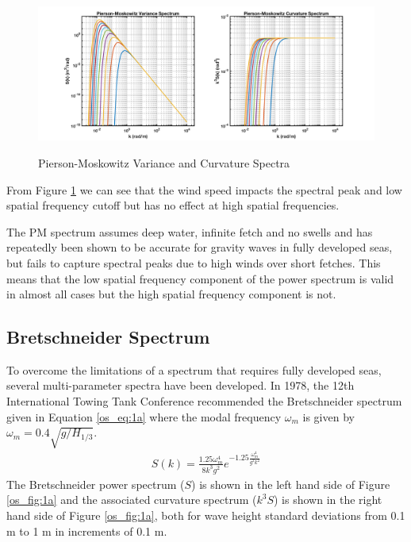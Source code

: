  \begin{figure}[H]
  \begin{center}
\includegraphics[width=6in]{../media/Ocean_Surface/PM_variance_curvature_spectrum.png}
  \end{center}
  \renewcommand{\baselinestretch}{1} \small\normalsize
  \begin{quote}
    \caption[Pierson-Moskowitz Variance and Curvature Spectra]{Pierson-Moskowitz Variance and Curvature Spectra\label{os_fig:1}}
  \end{quote}
\end{figure}
 \renewcommand{\baselinestretch}{2} \small\normalsize
 
 From Figure \ref{os_fig:1} we can see that the wind speed impacts the spectral peak and low spatial frequency cutoff but has no effect at high spatial frequencies.
 
The PM spectrum assumes deep water, infinite fetch and no swells and has repeatedly been shown to be accurate for gravity waves in fully developed seas, but fails to capture spectral peaks due to high winds over short fetches. This means that the low spatial frequency component of the power spectrum is valid in almost all cases but the high spatial frequency component is not.

\subsection{Bretschneider Spectrum}
To overcome the limitations of a spectrum that requires fully developed seas, several multi-parameter spectra have been developed. In 1978, the 12th International Towing Tank Conference recommended the Bretschneider spectrum \cite{michel_sea_spectra} given in Equation \ref{os_eq:1a} where the modal frequency $\omega_m$ is given by $\omega_m = 0.4\sqrt{g/H_{1/3}}$.
\begin{equation}
  \begin{gathered}
  \label{os_eq:1a}
  S(k) = \frac{1.25 \omega_m^4}{8k^3g^2}e^{-1.25\frac{\omega_m^4}{g^2k^2}} 
  \end{gathered}
\end{equation}
\renewcommand{\baselinestretch}{2} \small\normalsize
The Bretschneider power spectrum ($S$) is shown in the left hand side of Figure \ref{os_fig:1a} and the associated curvature spectrum ($k^3S$) is shown in the right hand side of Figure \ref{os_fig:1a}, both for wave height standard deviations from 0.1 m to 1 m in increments of 0.1 m.

